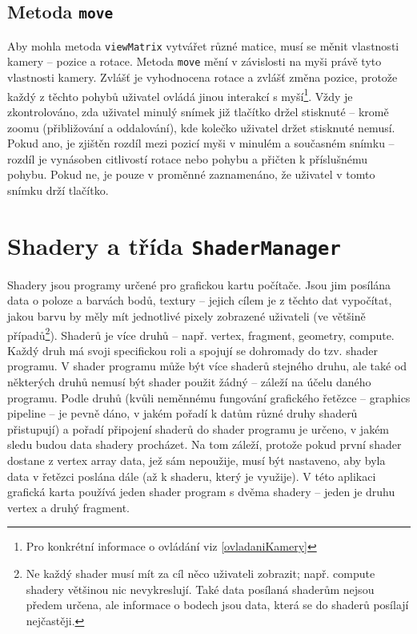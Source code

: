 \documentclass[a4paper, 11pt]{report}
\begin{document}
\subsection{Metoda \texttt{move}}
Aby mohla metoda \texttt{viewMatrix} vytvářet různé matice, musí se měnit vlastnosti kamery -- pozice a rotace. Metoda \texttt{move} mění v závislosti na myši právě tyto vlastnosti kamery. Zvlášť je vyhodnocena rotace a zvlášť změna pozice, protože každý z těchto pohybů uživatel ovládá jinou interakcí s myší\footnote{Pro konkrétní informace o ovládání viz \ref{ovladaniKamery}}. Vždy je zkontrolováno, zda uživatel minulý snímek již tlačítko držel stisknuté -- kromě zoomu (přibližování a oddalování), kde kolečko uživatel držet stisknuté nemusí. Pokud ano, je zjištěn rozdíl mezi pozicí myši v minulém a současném snímku -- rozdíl je vynásoben citlivostí rotace nebo pohybu a přičten k příslušnému pohybu. Pokud ne, je pouze v proměnné zaznamenáno, že uživatel v tomto snímku drží tlačítko.

\section{\label{shadery}Shadery a třída \texttt{ShaderManager}}
Shadery jsou programy určené pro grafickou kartu počítače. Jsou jim posílána data o poloze a barvách bodů, textury -- jejich cílem je z těchto dat vypočítat, jakou barvu by měly mít jednotlivé pixely zobrazené uživateli (ve většině případů\footnote{Ne každý shader musí mít za cíl něco uživateli zobrazit; např. compute shadery většinou nic nevykreslují. Také data posílaná shaderům nejsou předem určena, ale informace o bodech jsou data, která se do shaderů posílají nejčastěji.}). Shaderů je více druhů -- např. vertex, fragment, geometry, compute. Každý druh má svoji specifickou roli a spojují se dohromady do tzv. shader programu. V shader programu může být více shaderů stejného druhu, ale také od některých druhů nemusí být shader použit žádný -- záleží na účelu daného programu. Podle druhů (kvůli neměnnému fungování grafického řetězce -- graphics pipeline -- je pevně dáno, v jakém pořadí k datům různé druhy shaderů přistupují) a pořadí připojení shaderů do shader programu je určeno, v jakém sledu budou data shadery procházet. Na tom záleží, protože pokud první shader dostane z vertex array data, jež sám nepoužije, musí být nastaveno, aby byla data v řetězci poslána dále (až k shaderu, který je využije). V této aplikaci grafická karta používá jeden shader program s dvěma shadery -- jeden je druhu vertex a druhý fragment.
\end{document}
